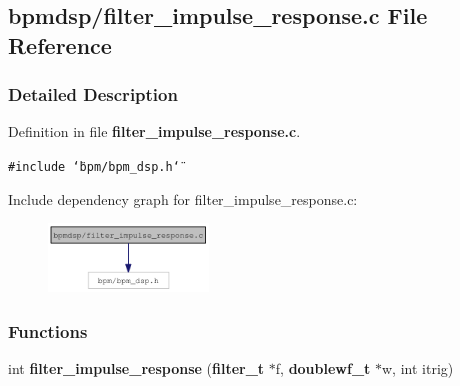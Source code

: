 \subsection{bpmdsp/filter\_\-impulse\_\-response.c File Reference}
\label{filter__impulse__response_8c}


\subsubsection{Detailed Description}


Definition in file {\bf filter\_\-impulse\_\-response.c}.

{\tt \#include \char`\"{}bpm/bpm\_\-dsp.h\char`\"{}}\par


Include dependency graph for filter\_\-impulse\_\-response.c:\nopagebreak
\begin{figure}[H]
\begin{center}
\leavevmode
\includegraphics[width=121pt]{filter__impulse__response_8c__incl}
\end{center}
\end{figure}
\subsubsection*{Functions}
\begin{CompactItemize}
\item 
int {\bf filter\_\-impulse\_\-response} ({\bf filter\_\-t} $\ast$f, {\bf doublewf\_\-t} $\ast$w, int itrig)
\end{CompactItemize}

